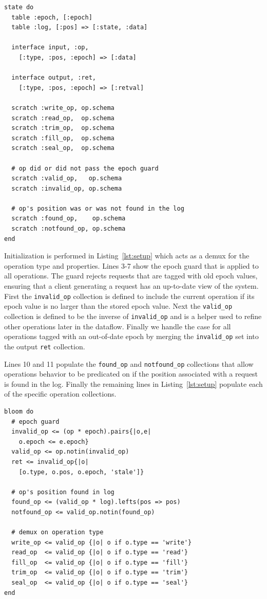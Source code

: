 \documentclass[10pt,twocolumn]{article}
\begin{document}
\begin{lstlisting}[caption={State Declaration}, label=lst:state]
state do
  table :epoch, [:epoch]
  table :log, [:pos] => [:state, :data]

  interface input, :op,
    [:type, :pos, :epoch] => [:data]

  interface output, :ret,
    [:type, :pos, :epoch] => [:retval]

  scratch :write_op, op.schema
  scratch :read_op,  op.schema
  scratch :trim_op,  op.schema
  scratch :fill_op,  op.schema
  scratch :seal_op,  op.schema

  # op did or did not pass the epoch guard
  scratch :valid_op,   op.schema
  scratch :invalid_op, op.schema

  # op's position was or was not found in the log
  scratch :found_op,    op.schema
  scratch :notfound_op, op.schema
end
\end{lstlisting}

Initialization is performed in Listing~\ref{lst:setup} which acts as a demux
for the operation type and properties.  Lines 3-7 show the epoch guard that is
applied to all operations.  The guard rejects requests that are tagged with old
epoch values, ensuring that a client generating a request has an up-to-date
view of the system.  First the \texttt{invalid\_op} collection is defined to
include the current operation if its epoch value is no larger than the stored
epoch value. Next the \texttt{valid\_op} collection is defined to be the
inverse of \texttt{invalid\_op} and is a helper used to refine other operations
later in the dataflow. Finally we handle the case for all operations tagged
with an out-of-date epoch by merging the \texttt{invalid\_op} set into the
output \texttt{ret} collection.

Lines 10 and 11 populate the \texttt{found\_op} and \texttt{notfound\_op}
collections that allow operations behavior to be predicated on if the position
associated with a request is found in the log. Finally the remaining lines in
Listing~\ref{lst:setup} populate each of the specific operation collections.

\begin{lstlisting}[caption={Setup}, label=lst:setup]
bloom do
  # epoch guard
  invalid_op <= (op * epoch).pairs{|o,e|
    o.epoch <= e.epoch}
  valid_op <= op.notin(invalid_op)
  ret <= invalid_op{|o|
    [o.type, o.pos, o.epoch, 'stale']}

  # op's position found in log
  found_op <= (valid_op * log).lefts(pos => pos)
  notfound_op <= valid_op.notin(found_op)

  # demux on operation type
  write_op <= valid_op {|o| o if o.type == 'write'}
  read_op  <= valid_op {|o| o if o.type == 'read'}
  fill_op  <= valid_op {|o| o if o.type == 'fill'}
  trim_op  <= valid_op {|o| o if o.type == 'trim'}
  seal_op  <= valid_op {|o| o if o.type == 'seal'}
end
\end{lstlisting}
\end{document}
